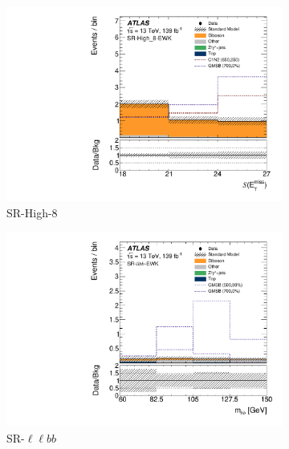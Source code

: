 \begin{figure}[tp]
\centering
\begin{subfigure}{0.49\textwidth}
\centering
\includegraphics[width=\textwidth]{figures/2ljets_sr_high_8_met_sig.pdf}
\caption{SR-High-8}
\end{subfigure}
\hfill
\begin{subfigure}{0.49\textwidth}
\centering
\includegraphics[width=\textwidth]{figures/2ljets_sr_llbb_mbb.pdf}
\caption{SR-$\ell\ell bb$}
\end{subfigure}
\\[0.5em]
\begin{subfigure}{0.49\textwidth}
\centering

\end{subfigure}
\end{figure}
